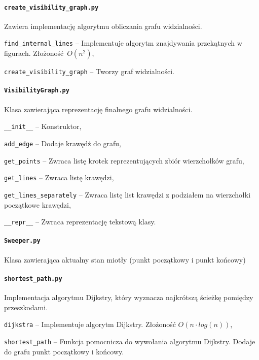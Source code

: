 \documentclass[12pt]{article}
\let\tempone\itemize
\let\temptwo\enditemize
\renewenvironment{itemize}{\tempone\setlength{\itemsep}{0cm}}{\temptwo}
\begin{document}
		\paragraph{\lstinline|create_visibility_graph.py|}
			Zawiera implementację algorytmu obliczania grafu widzialności.
			\begin{itemize}
				\item \lstinline|find_internal_lines| -- Implementuje algorytm znajdywania przekątnych w figurach. Złożoność $ O(n^2) $,
				\item \lstinline|create_visibility_graph| -- Tworzy graf  widzialności.
			\end{itemize}
		
		\paragraph{\lstinline|VisibilityGraph.py|}
			Klasa zawierająca reprezentację finalnego grafu widzialności.
			\begin{itemize}
				\item \lstinline|__init__| -- Konstruktor,
				\item \lstinline|add_edge| -- Dodaje krawędź do grafu,
				\item \lstinline|get_points| -- Zwraca listę krotek reprezentujących zbiór wierzchołków grafu,
				\item \lstinline|get_lines| -- Zwraca listę krawędzi,
				\item \lstinline|get_lines_separately| -- Zwraca listę list krawędzi z podziałem na wierzchołki początkowe krawędzi,
				\item \lstinline|__repr__| -- Zwraca reprezentację tekstową klasy.
			\end{itemize}
		
		\paragraph{\lstinline|Sweeper.py|}
			Klasa zawierająca aktualny stan miotły (punkt początkowy i punkt końcowy)
		
		\paragraph{\lstinline|shortest_path.py|}
			Implementacja algorytmu Dijkstry, który wyznacza najkrótszą ścieżkę pomiędzy przeszkodami.
			\begin{itemize}
				\item \lstinline|dijkstra| -- Implementuje algorytm Dijkstry. Złożoność $ O(n \cdot log(n)) $,
				\item \lstinline|shortest_path| -- Funkcja pomocnicza do wywołania algorytmu Dijkstry.  Dodaje do grafu punkt początkowy i końcowy.
			\end{itemize}
		
\end{document}
